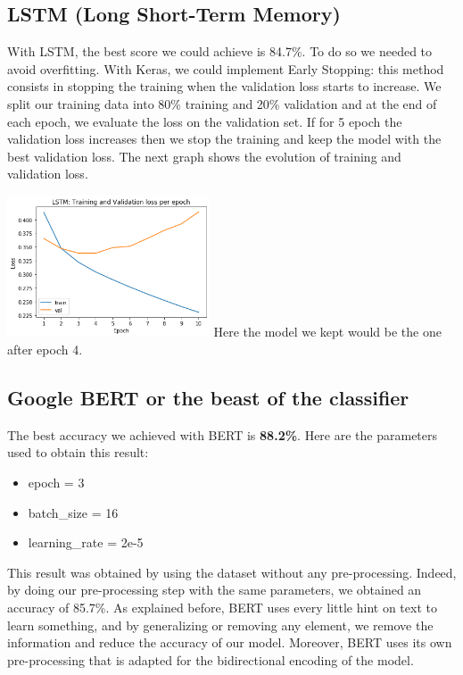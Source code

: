 \documentclass[letterpaper, 10 pt, conference]{ieeeconf}  %
\begin{document}
\subsection{LSTM (Long Short-Term Memory)} 

With LSTM, the best score we could achieve is 84.7\%. To do so we needed to avoid overfitting. With Keras, we could implement Early Stopping: this method consists in stopping the training when the validation loss starts to increase. We split our training data into 80\% training and 20\% validation and at the end of each epoch, we evaluate the loss on the validation set. If for 5 epoch the validation loss increases then we stop the training and keep the model with the best validation loss. The next graph shows the evolution of training and validation loss.

\includegraphics[width=0.45\textwidth]{train_val_accuracy.png}
Here the model we kept would be the one after epoch 4. 


\subsection{Google BERT or the beast of the classifier}

The best accuracy we achieved with BERT is \textbf{88.2\%}. Here are the parameters used to obtain this result:
\begin{itemize}
    \item epoch = 3
    \item batch\_size = 16
    \item learning\_rate = 2e-5 
\end{itemize}{}

This result was obtained by using the dataset without any pre-processing. Indeed, by doing our pre-processing step with the same parameters, we obtained an accuracy of 85.7\%. As explained before, BERT uses every little hint on text to learn something, and by generalizing or removing any element, we remove the information and reduce the accuracy of our model. Moreover, BERT uses its own pre-processing that is adapted for the bidirectional encoding of the model.
\end{document}
